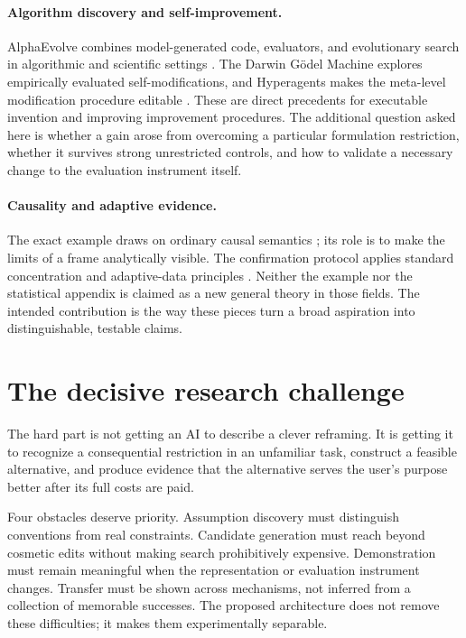 \documentclass[11pt,letterpaper]{article}
\theoremstyle{remark}\newtheorem{remark}{Remark}[section]
\begin{document}
\paragraph{Algorithm discovery and self-improvement.}
AlphaEvolve combines model-generated code, evaluators, and evolutionary search in algorithmic and scientific settings \citep{novikov2025alphaevolve}. The Darwin G\"odel Machine explores empirically evaluated self-modifications, and Hyperagents makes the meta-level modification procedure editable \citep{zhang2025dgm,zhang2026hyperagents}. These are direct precedents for executable invention and improving improvement procedures. The additional question asked here is whether a gain arose from overcoming a particular formulation restriction, whether it survives strong unrestricted controls, and how to validate a necessary change to the evaluation instrument itself.

\paragraph{Causality and adaptive evidence.}
The exact example draws on ordinary causal semantics \citep{pearl2009causal}; its role is to make the limits of a frame analytically visible. The confirmation protocol applies standard concentration and adaptive-data principles \citep{hoeffding1963inequalities,dwork2014adaptive,howard2021confidence}. Neither the example nor the statistical appendix is claimed as a new general theory in those fields. The intended contribution is the way these pieces turn a broad aspiration into distinguishable, testable claims.

\clearpage
\section{The decisive research challenge}
\label{sec:conclusion}
The hard part is not getting an AI to describe a clever reframing. It is getting it to recognize a consequential restriction in an unfamiliar task, construct a feasible alternative, and produce evidence that the alternative serves the user's purpose better after its full costs are paid.

Four obstacles deserve priority. Assumption discovery must distinguish conventions from real constraints. Candidate generation must reach beyond cosmetic edits without making search prohibitively expensive. Demonstration must remain meaningful when the representation or evaluation instrument changes. Transfer must be shown across mechanisms, not inferred from a collection of memorable successes. The proposed architecture does not remove these difficulties; it makes them experimentally separable.
\end{document}
